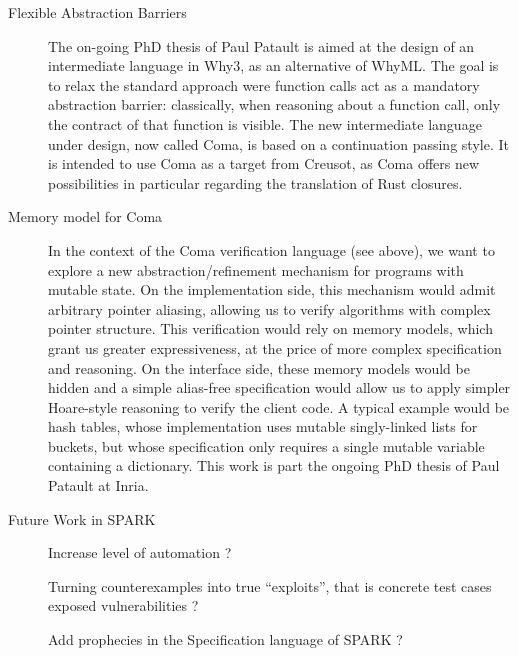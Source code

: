 \documentclass[a4paper,11pt]{article}
\begin{document}
\begin{description}
\item[Flexible Abstraction Barriers]

  The on-going PhD thesis of Paul Patault is aimed at the design of an
  intermediate language in Why3, as an alternative of WhyML. The goal is to
  relax the standard approach were function calls act as a mandatory abstraction
  barrier: classically, when reasoning about a function call, only the contract
  of that function is visible. The new intermediate language under design, now
  called Coma, is based on a continuation passing style. It is intended to use
  Coma as a target from Creusot, as Coma offers new possibilities in particular
  regarding the translation of Rust closures.

\item[Memory model for Coma]

  In the context of the Coma verification language (see above),
  we want to explore a new abstraction/refinement mechanism for
  programs with mutable state.
  On the implementation side, this mechanism would admit arbitrary
  pointer aliasing, allowing us to verify algorithms with complex
  pointer structure.
  This verification would rely on memory models, which grant us
  greater expressiveness, at the price of more complex specification
  and reasoning.
  On the interface side, these memory models would be hidden and a
  simple alias-free specification would allow us to apply simpler
  Hoare-style reasoning to verify the client code.
  A typical example would be hash tables, whose implementation uses
  mutable singly-linked lists for buckets, but whose specification
  only requires a single mutable variable containing a dictionary.
  This work is part the ongoing PhD thesis of Paul Patault at Inria.

\item[Future Work in SPARK]


  Increase level of automation ?

  Turning counterexamples into true ``exploits'', that is concrete test cases
  exposed vulnerabilities ?

  Add prophecies in the Specification language of SPARK ?


\end{description}
\end{document}
